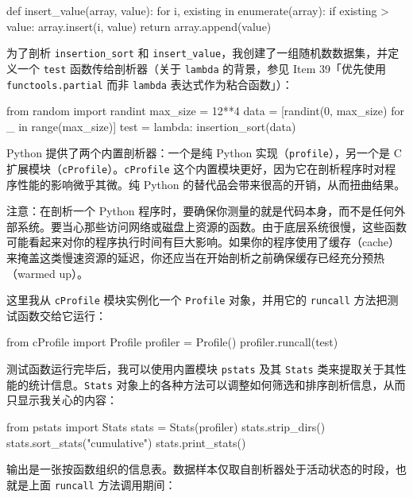 \begin{codebox}[python]
def insert_value(array, value):
    for i, existing in enumerate(array):
        if existing > value:
            array.insert(i, value)
            return
    array.append(value)
\end{codebox}

为了剖析 \texttt{insertion\_sort} 和 \texttt{insert\_value}，我创建了一组随机数数据集，并定义一个 \texttt{test} 函数传给剖析器（关于 \texttt{lambda} 的背景，参见 Item 39「优先使用 \texttt{functools.partial} 而非 \texttt{lambda} 表达式作为粘合函数」）：

\begin{codebox}[python]
from random import randint
max_size = 12**4
data = [randint(0, max_size) for _ in range(max_size)]
test = lambda: insertion_sort(data)
\end{codebox}

Python 提供了两个内置剖析器：一个是纯 Python 实现（\texttt{profile}），另一个是 C 扩展模块（\texttt{cProfile}）。\texttt{cProfile} 这个内置模块更好，因为它在剖析程序时对程序性能的影响微乎其微。纯 Python 的替代品会带来很高的开销，从而扭曲结果。

注意：在剖析一个 Python 程序时，要确保你测量的就是代码本身，而不是任何外部系统。要当心那些访问网络或磁盘上资源的函数。由于底层系统很慢，这些函数可能看起来对你的程序执行时间有巨大影响。如果你的程序使用了缓存（cache）来掩盖这类慢速资源的延迟，你还应当在开始剖析之前确保缓存已经充分预热（warmed up）。

这里我从 \texttt{cProfile} 模块实例化一个 \texttt{Profile} 对象，并用它的 \texttt{runcall} 方法把测试函数交给它运行：

\begin{codebox}[python]
from cProfile import Profile
profiler = Profile()
profiler.runcall(test)
\end{codebox}

测试函数运行完毕后，我可以使用内置模块 \texttt{pstats} 及其 \texttt{Stats} 类来提取关于其性能的统计信息。\texttt{Stats} 对象上的各种方法可以调整如何筛选和排序剖析信息，从而只显示我关心的内容：

\begin{codebox}[python]
from pstats import Stats
stats = Stats(profiler)
stats.strip_dirs()
stats.sort_stats("cumulative")
stats.print_stats()
\end{codebox}

输出是一张按函数组织的信息表。数据样本仅取自剖析器处于活动状态的时段，也就是上面 \texttt{runcall} 方法调用期间：

